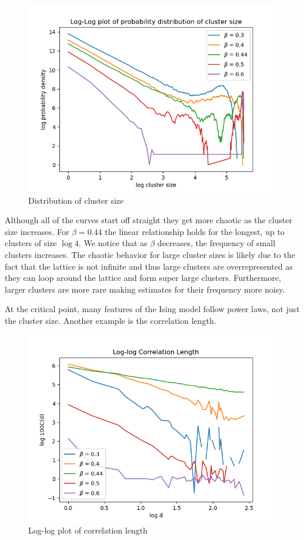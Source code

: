 \documentclass{article}
\begin{document}
\begin{figure}[ht]
    \includegraphics[width=\columnwidth]{plots/cluster_size.png}
    \caption{Distribution of cluster size}
    \label{fig:6}
\end{figure}

Although all of the curves start off straight they get more chaotic as the cluster size increases. For $\beta = 0.44$
the linear relationship holds for the longest, up to clusters of size $\log 4$. We notice that as $\beta$ decreases, 
the frequency of small clusters increases. The chaotic behavior for large cluster sizes is likely due to the fact that the lattice
is not infinite and thus large clusters are overrepresented as they can loop around the lattice and form super large clusters. 
Furthermore, larger clusters are more rare making estimates for their frequency more noisy. 

At the critical point, many features of the Ising model follow power laws, not just the cluster size. Another example is
the correlation length. 

\begin{figure}[ht]
    \includegraphics[width=\columnwidth]{plots/log_log_corr_len.png}
    \caption{Log-log plot of correlation length}
    \label{fig:6}
\end{figure}
\end{document}
